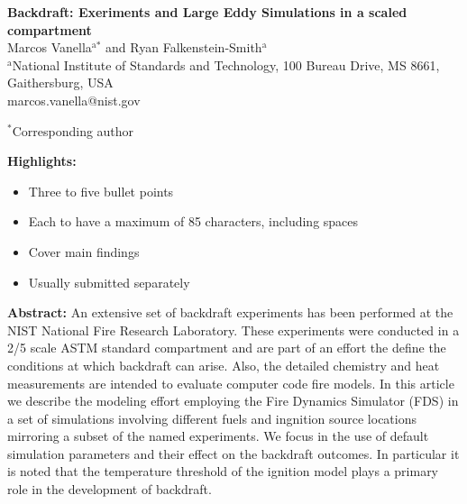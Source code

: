\documentclass[12pt,letterpaper]{article}
\begin{document}
\begin{flushleft} %

\textbf{Backdraft: Exeriments and Large Eddy Simulations in a scaled compartment}
\vspace{3mm}\\
%
Marcos Vanella$^\text{a*}$ and Ryan Falkenstein-Smith$^\text{a}$
\vspace{3mm}\\	

$^\text{a}$National Institute of Standards and Technology, 100 Bureau Drive, MS 8661, Gaithersburg, USA  \\
marcos.vanella@nist.gov
\vspace{3mm}

$^*$Corresponding author

\textbf{Highlights:}	
\begin{itemize}
	\itemsep-4pt %
	\item Three to five bullet points
	\item Each to have a maximum of 85 characters, including spaces
	\item Cover main findings
	\item Usually submitted separately
\end{itemize}
\vspace{3mm}

\textbf{Abstract:}
\vspace{3mm}
An extensive set of backdraft experiments has been performed at the NIST National Fire Research Laboratory. These experiments were conducted in a 2/5 scale ASTM standard compartment and are part of an effort the define the conditions at which backdraft can arise. Also, the detailed chemistry and heat measurements are intended to evaluate computer code fire models. In this article we describe the modeling effort employing the Fire Dynamics Simulator (FDS) in a set of simulations involving different fuels and ingnition source locations mirroring a subset of the named experiments. We focus in the use of default simulation parameters and their effect on the backdraft outcomes. In particular it is noted that the temperature threshold of the ignition model plays a primary role in the development of backdraft.


\end{flushleft}
\end{document}

